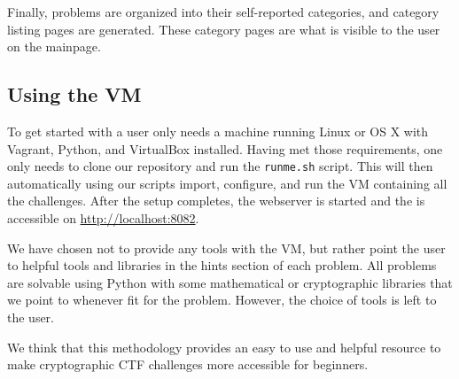 Finally, problems are organized into their self-reported categories,
and category listing pages are generated. These category pages are
what is visible to the user on the mainpage.

\subsection{Using the VM}
To get started with \cvm{} a user only needs a machine running Linux or
OS X with Vagrant, Python, and VirtualBox installed. Having met those
requirements, one only needs to clone our repository and run the
\verb|runme.sh| script. This will then automatically using our scripts
import, configure, and run the VM containing all the challenges. After
the setup completes, the webserver is started and the \cvm{} is
accessible on \url{http://localhost:8082}.

We have chosen not to provide any tools with the VM, but rather point
the user to helpful tools and libraries in the hints section of each
problem. All problems are solvable using Python with some mathematical
or cryptographic libraries that we point to whenever fit for the
problem. However, the choice of tools is left to the user.

We think that this methodology provides an easy to use and helpful
resource to make cryptographic CTF challenges more accessible for
beginners.
